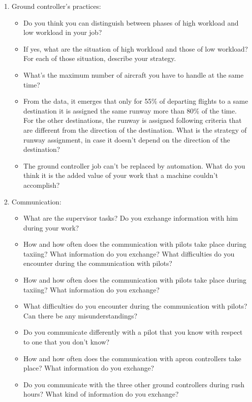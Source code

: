 \documentclass{article}
\begin{document}
\begin{enumerate}
\begin{itemize}
        \end{itemize}
    \item Ground controller's practices:
        \begin{itemize}
        	\item Do you think you can distinguish between phases of high workload and low workload in your job? 
        	\item If yes, what are the situation of high workload and those of low workload? For each of those situation, describe your strategy.
            \item What's the maximum number of aircraft you have to handle at the same time?
            \item From the data, it emerges that only for 55\% of departing flights to a same destination it is assigned the same runway more than 80\% of the time. For the other destinations, the runway is assigned following criteria that are different from the direction of the destination. What is the strategy of runway assignment, in case it doesn't depend on the direction of the destination?
            \item The ground controller job can't be replaced by automation. What do you think it is the added value of your work that a machine couldn't accomplish?
        \end{itemize}
    \item Communication:
        \begin{itemize}
            \item What are the supervisor tasks? Do you exchange information with him during your work?
            \item How and how often does the communication with pilots take place during taxiing? What information do you exchange? What difficulties do you encounter during the communication with pilots? 
            \item How and how often does the communication with pilots take place during taxiing? What information do you exchange? 
            \item What difficulties do you encounter during the communication with pilots? Can there be any misunderstandings?
            \item Do you communicate differently with a pilot that you know with respect to one that you don't know?
            \item How and how often does the communication with apron controllers take place? What information do you exchange?
            \item Do you communicate with the three other ground controllers during rush hours? What kind of information do you exchange?
        \end{itemize}
        

\end{enumerate}
\end{document}
